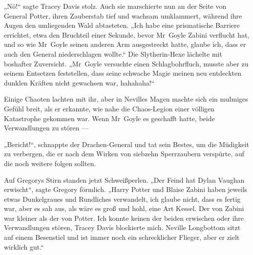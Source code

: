 „Nö!“ sagte Tracey Davis stolz. Auch sie marschierte nun an der Seite von General Potter, ihren Zauberstab tief und wachsam umklammert, während ihre Augen den umliegenden Wald abtasteten.
„Ich habe eine prismatische Barriere errichtet, etwa den Bruchteil einer Sekunde, bevor Mr~Goyle Zabini verflucht hat, und so wie Mr~Goyle seinen anderen Arm ausgestreckt hatte, glaube ich, dass er auch den General niederschlagen wollte.“ Die Slytherin-Hexe lächelte mit boshafter Zuversicht.
„Mr~Goyle versuchte einen Schlagbohrfluch, musste aber zu seinem Entsetzen feststellen, dass seine schwache Magie meinen neu entdeckten dunklen Kräften nicht gewachsen war, hahahaha!“

Einige Chaoten lachten mit ihr, aber in Nevilles Magen machte sich ein mulmiges Gefühl breit, als er erkannte, wie nahe die Chaos-Legion einer völligen Katastrophe gekommen war. Wenn Mr~Goyle es geschafft hatte, beide Verwandlungen zu stören —

\later

„Bericht!“, schnappte der Drachen-General und tat sein Bestes, um die Müdigkeit zu verbergen, die er nach dem Wirken von siebzehn Sperrzaubern verspürte, auf die noch weitere folgen sollten.

Auf Gregorys Stirn standen jetzt Schweißperlen.
„Der Feind hat Dylan Vaughan erwischt“, sagte Gregory förmlich.
„Harry Potter und Blaise Zabini haben jeweils etwas Dunkelgraues und Rundliches verwandelt, ich glaube nicht, dass es fertig war, aber es sah aus, als wäre es groß und hohl, eine Art Kessel. Der von Zabini war kleiner als der von Potter. Ich konnte keinen der beiden erwischen oder ihre Verwandlungen stören, Tracey Davis blockierte mich. Neville Longbottom sitzt auf einem Besenstiel und ist immer noch ein schrecklicher Flieger, aber er zielt wirklich gut.“

